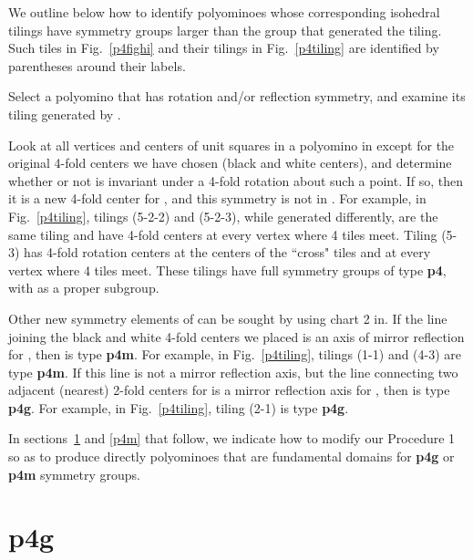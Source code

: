 \documentclass{ws-ijcga}
\begin{document}
We outline below how to identify polyominoes whose corresponding isohedral tilings
have symmetry groups larger than the group  that generated the tiling. 
Such tiles in Fig.~\ref{p4fighi} and their tilings in Fig.~\ref{p4tiling} are identified by 
parentheses around their labels.
\begin{itemlist}
\item
Select a polyomino that has rotation and/or reflection symmetry, and examine its
tiling  generated by .
\item
Look at all vertices and centers of unit squares in a polyomino in  except for the
original 4-fold centers we have chosen (black and white centers), and determine whether
or not  is invariant under a 4-fold rotation about such a point. 
If so, then it is a new 4-fold center for , and this symmetry is not in . 
For example, in Fig.~\ref{p4tiling}, tilings (5-2-2)
and (5-2-3), while generated differently, are the same tiling and have 4-fold centers at
every vertex where 4 tiles meet. 
Tiling (5-3) has 4-fold rotation centers at the centers of
the ``cross" tiles and at every vertex where 4 tiles meet. 
These tilings have full symmetry groups of type {\bf p4}, with  as a proper subgroup.
\item
Other new symmetry elements of  can be sought by using chart 2 in\cite{schatt}. If the line joining the black and white 4-fold centers we placed is
an axis of mirror reflection for , then  is type {\bf p4m}. 
For example, in Fig.~\ref{p4tiling}, tilings (1-1)
and (4-3) are type {\bf p4m}. 
If this line is not a mirror reflection axis, but the line connecting
two adjacent (nearest) 2-fold centers for  is a mirror reflection axis for , 
then  is type {\bf p4g}. 
For example, in Fig.~\ref{p4tiling}, tiling (2-1) is type {\bf p4g}.
\end{itemlist}

In sections~\ref{p4g} and \ref{p4m} that follow, 
we indicate how to modify our Procedure 1 so as to
produce directly polyominoes that are fundamental domains for {\bf p4g} or {\bf p4m} symmetry
groups.











\section{{\bf p4g}}
\label{p4g}
\end{document}
